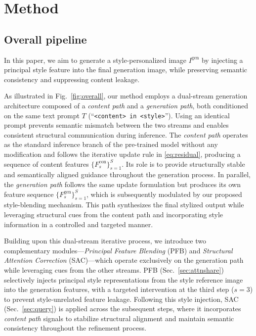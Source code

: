 \documentclass[10pt,twocolumn,letterpaper]{article}
\newcommand{\figref}[1]{Fig.~\ref{#1}}
\newcommand{\secref}[1]{Sec.~\ref{#1}}
\begin{document}
\section{Method}
\subsection{Overall pipeline}

In this paper, we aim to generate a style-personalized image \(I^\text{gen}\) by injecting a principal style feature into the final generation image, while preserving semantic consistency and suppressing content leakage. 

As illustrated in \figref{fig:overall}, our method employs a dual-stream generation architecture composed of a \textit{content path} and a \textit{generation path}, both conditioned on the same text prompt \(T\) (``\texttt{<content> in <style>}''). Using an identical prompt prevents semantic mismatch between the two streams and enables consistent structural communication during inference. The \textit{content path} operates as the standard inference branch of the pre-trained model without any modification and follows the iterative update rule in \eqref{eq:residual}, producing a sequence of content features $\{F_s^{\text{con}}\}_{s=1}^{S}$. Its role is to provide structurally stable and semantically aligned guidance throughout the generation process. In parallel, the \textit{generation path} follows the same update formulation but produces its own feature sequence $\{F_s^{\text{gen}}\}_{s=1}^{S}$, which is subsequently modulated by our proposed style-blending mechanism. This path synthesizes the final stylized output while leveraging structural cues from the content path and incorporating style information in a controlled and targeted manner.

Building upon this dual-stream iterative process, we introduce two complementary modules—\textit{Principal Feature Blending} (PFB) and \textit{Structural Attention Correction} (SAC)—which operate exclusively on the generation path while leveraging cues from the other streams. PFB (\secref{sec:attnshare}) selectively injects principal style representations from the style reference image into the generation features, with a targeted intervention at the third step ($s=3$) to prevent style-unrelated feature leakage. 
Following this style injection, SAC (\secref{sec:query}) is applied across the subsequent steps, where it incorporates \textit{content path} signals to stabilize structural alignment and maintain semantic consistency throughout the refinement process.
\end{document}
